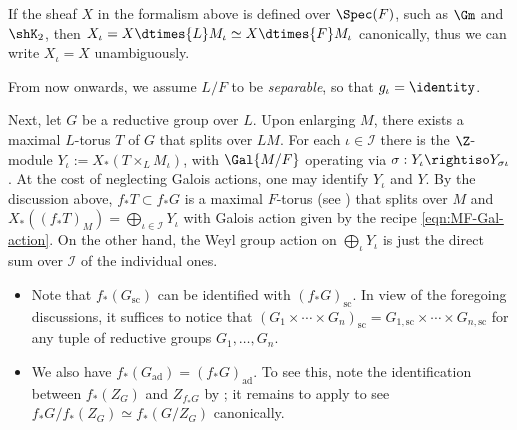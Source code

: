 \documentclass[a4paper,10pt]{article}
\begin{document}
\begin{remark}
	If the sheaf $X$ in the formalism above is defined over $\Spec(F)$, such as $\Gm$ and $\shK_2$, then $X_\iota = X \dtimes{L} M_\iota \simeq X \dtimes{F} M_\iota$ canonically, thus we can write $X_\iota = X$ unambiguously.
\end{remark}

\begin{notation}
	From now onwards, we assume $L/F$ to be \emph{separable}, so that $g_\iota = \identity$.
\end{notation}

Next, let $G$ be a reductive group over $L$. Upon enlarging $M$, there exists a maximal $L$-torus $T$ of $G$ that splits over $LM$. For each $\iota \in \mathcal{I}$ there is the $\Z$-module $Y_\iota := X_*(T \times_L M_\iota)$, with $\Gal{M/F}$ operating via $\sigma: Y_{\iota} \rightiso Y_{\sigma\iota}$. At the cost of neglecting Galois actions, one may identify $Y_\iota$ and $Y$. By the discussion above, $f_* T \subset f_* G$ is a maximal $F$-torus (see \cite[Proposition A.5.15]{CGP15}) that splits over $M$ and $X_*((f_* T)_M) = \bigoplus_{\iota \in \mathcal{I}} Y_\iota$ with Galois action given by the recipe \eqref{eqn:MF-Gal-action}. On the other hand, the Weyl group action on $\bigoplus_\iota Y_\iota$ is just the direct sum over $\mathcal{I}$ of the individual ones.

\begin{itemize}
	\item Note that $f_*(G_\text{sc})$ can be identified with $(f_* G)_\text{sc}$. In view of the foregoing discussions, it suffices to notice that $(G_1 \times \cdots \times G_n)_\text{sc} = G_{1,\text{sc}} \times \cdots \times G_{n,\text{sc}}$ for any tuple of reductive groups $G_1, \ldots, G_n$.
	\item We also have $f_*(G_\text{ad}) = (f_* G)_\text{ad}$. To see this, note the identification between $f_*(Z_G)$ and $Z_{f_* G}$ by \cite[Proposition A.5.15]{CGP15}; it remains to apply \cite[Corollary A.5.4 (3)]{CGP15} to see $f_* G / f_*(Z_G) \simeq f_*(G/Z_G)$ canonically.
\end{itemize}
\end{document}
